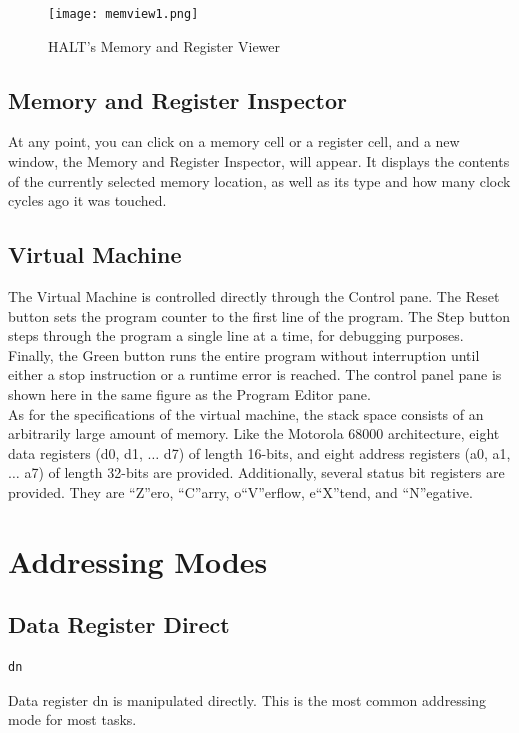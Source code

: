 \documentclass[10pt,fullpage]{article}
\begin{document}
\begin{figure}[hp]
  \begin{center}
    \texttt{[image: memview1.png]}
    \caption{HALT's Memory and Register Viewer}
  \end{center}
\end{figure}

\subsection*{Memory and Register Inspector}
At any point, you can click on a memory cell or a register cell, and
a new window, the Memory and Register Inspector, will appear. It
displays the contents of the currently selected memory location, as
well as its type and how many clock cycles ago it was touched.

\subsection*{Virtual Machine}
The Virtual Machine is controlled directly through the Control pane.
The Reset button sets the program counter to the first line of the
program. The Step button steps through the program a single line at
a time, for debugging purposes. Finally, the Green button runs the
entire program without interruption until either a stop instruction
or a runtime error is reached. The control panel pane is shown here
in the same figure as the Program Editor pane.\\
As for the specifications of the virtual machine, the stack space
consists of an arbitrarily large amount of memory. Like the Motorola
68000 architecture, eight data registers (d0, d1, $\ldots$ d7) of
length 16-bits, and eight address registers (a0, a1, $\ldots$ a7) of
length 32-bits are provided. Additionally, several status bit
registers are provided. They are ``Z''ero, ``C''arry, o``V''erflow,
e``X''tend, and ``N''egative.

\section*{Addressing Modes}

\subsection*{Data Register Direct}
\begin{verbatim}dn\end{verbatim}
Data register dn is manipulated directly. This is the most common
addressing mode for most tasks.
\end{document}
